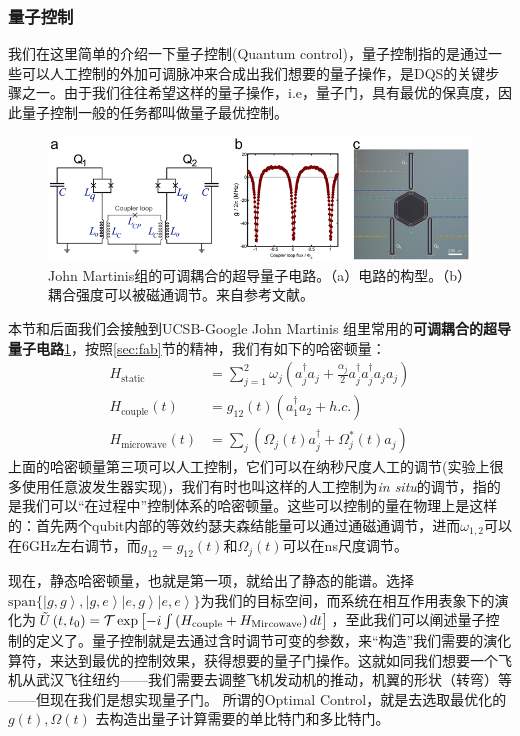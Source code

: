 \documentclass[supercite]{HustGraduPaper}
\newcommand{\ket}[1]{\left| #1 \right\rangle}
\begin{document}
	\subsubsection{量子控制}
	我们在这里简单的介绍一下量子控制(Quantum control)，量子控制指的是通过一些可以人工控制的外加可调脉冲来合成出我们想要的量子操作，是DQS的关键步骤之一。由于我们往往希望这样的量子操作，i.e，量子门，具有最优的保真度，因此量子控制一般的任务都叫做量子最优控制。
	\begin{figure}
		\centering
		\includegraphics[width=1\linewidth]{Figures/control/SuppDevice-v0-LR}
		\caption{John Martinis组的可调耦合的超导量子电路。（a）电路的构型。（b）耦合强度可以被磁通调节。来自参考文献\cite{Roushan2017a}。}
		\label{fig:suppdevice-v0-lr}
	\end{figure}
	本节和后面我们会接触到UCSB-Google John Martinis 组\cite{Roushan2017a}里常用的\textbf{可调耦合的超导量子电路}\ref{fig:suppdevice-v0-lr}，按照\ref{sec:fab}节的精神，我们有如下的哈密顿量：
	\begin{equation}
	\begin{aligned}
	 {H_{\text{static}}} &= \sum\limits_{j = 1}^2 {{\omega _j}\left( {a_j^\dag {a_j} + \frac{{{\alpha _j}}}{2}a_j^\dag a_j^\dag {a_j}{a_j}} \right)} \\
	  {H_{\text{couple}}}\left( t \right)&= {g_{12}}\left( t \right)\left( {a_1^\dag {a_2} + h.c.} \right)\\
	   {H_{\text{microwave}}}\left( t \right) &= \sum\limits_j {\left( {{\Omega _j}\left( t \right)a_j^\dag + \Omega _j^*\left( t \right){a_j}} \right)} 
	\end{aligned}
	\end{equation}
上面的哈密顿量第三项可以人工控制，它们可以在纳秒尺度人工的调节(实验上很多使用任意波发生器实现)，我们有时也叫这样的人工控制为\textit{in situ}的调节，指的是我们可以“在过程中”控制体系的哈密顿量。这些可以控制的量在物理上是这样的：首先两个qubit内部的等效约瑟夫森结能量可以通过通磁通调节，进而$\omega_{1,2}$可以在$6$GHz左右调节，而$g_{12} = g_{12}(t)$和$\Omega_j(t)$可以在ns尺度调节。


现在，静态哈密顿量，也就是第一项，就给出了静态的能谱。选择$\text{span}\{\ket{g,g}, \ket{g,e} \ket{e,g} \ket{e,e}\}$为我们的目标空间，而系统在相互作用表象下的演化为$\tilde U\left( {t,{t_0}} \right) = {\cal T}\exp \left[ { - i\int {\left( {{H_{\text{couple}}} + {H_{\text{Mircowave}}}} \right)dt} } \right]$，至此我们可以阐述量子控制的定义了。量子控制就是去通过含时调节可变的参数，来“构造”我们需要的演化算符，来达到最优的控制效果，获得想要的量子门操作。这就如同我们想要一个飞机从武汉飞往纽约——我们需要去调整飞机发动机的推动，机翼的形状（转弯）等——但现在我们是想实现量子门。
所谓的Optimal Control，就是去选取最优化的 $g\left( t \right),\Omega \left( t \right)$ 去构造出量子计算需要的单比特门和多比特门。
\end{document}
